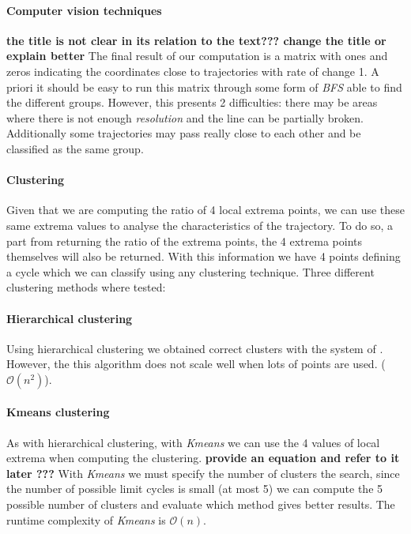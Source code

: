 \paragraph{Computer vision techniques}

{\bf the title is not clear in its relation to the text??? change the title or explain better}
The final result of our computation is a matrix with ones and zeros indicating the coordinates close to trajectories with rate of change 1. A priori it should be easy to run this matrix through some form of \emph{BFS} able to find the different groups. However, this presents 2 difficulties: there may be areas where there is not enough \emph{resolution} and the line can be partially broken. Additionally some trajectories may pass really close to each other and be classified as the same group.

\paragraph{Clustering}
Given that we are computing the ratio of 4 local extrema points, we can use these same extrema values to analyse the characteristics of the trajectory. To do so, a part from returning the ratio of the extrema points, the 4 extrema points themselves will also be returned. With this information we have 4 points defining a cycle which we can classify using any clustering technique. Three different clustering methods where tested:

\paragraph{Hierarchical clustering}

Using hierarchical clustering we obtained correct clusters with the system of \cite{kuznetsov_visualization_2013}. However, the this algorithm does not scale well when lots of points are used. ($\mathcal{O}(n^2)$).

\paragraph{Kmeans clustering}

As with hierarchical clustering, with \emph{Kmeans} we can use the 4 values of local extrema when computing the clustering. 
{\bf provide an equation and refer to it later ???}
With \emph{Kmeans} we must specify the number of clusters the search, since the number of possible limit cycles is small (at most 5) we can compute the 5 possible number of clusters and evaluate which method gives better results. The runtime complexity of \emph{Kmeans} is $\mathcal{O}(n)$.

